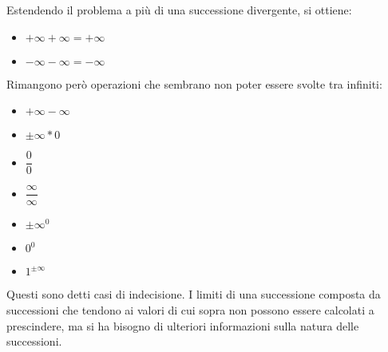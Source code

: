 Estendendo il problema a più di una successione divergente, si ottiene:
\begin{itemize}
	\item $+\infty+\infty=+\infty$
	\item $-\infty-\infty=-\infty$
\end{itemize}
Rimangono però operazioni che sembrano non poter essere svolte tra infiniti:
\begin{itemize}
	\item $+\infty-\infty$
	\item $\pm\infty*0$
	\item $\dfrac{0}{0}$
	\item $\dfrac{\infty}{\infty}$
	\item $\pm\infty^0$
	\item $0^0$
	\item $1^{\pm\infty}$
\end{itemize}
Questi sono detti casi di indecisione. I limiti di una successione composta da successioni che tendono ai valori di cui sopra non possono essere calcolati a prescindere, ma si ha bisogno di ulteriori informazioni sulla natura delle successioni.


